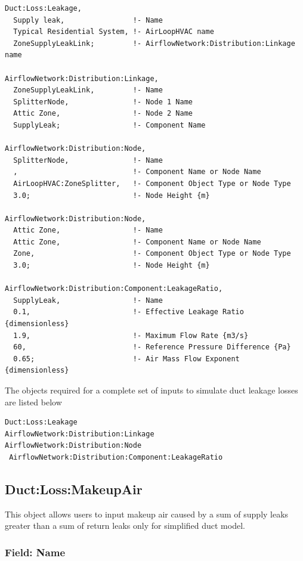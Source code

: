\begin{lstlisting}
Duct:Loss:Leakage,
  Supply leak,                !- Name
  Typical Residential System, !- AirLoopHVAC name
  ZoneSupplyLeakLink;         !- AirflowNetwork:Distribution:Linkage name

AirflowNetwork:Distribution:Linkage,
  ZoneSupplyLeakLink,         !- Name
  SplitterNode,               !- Node 1 Name
  Attic Zone,                 !- Node 2 Name
  SupplyLeak;                 !- Component Name

AirflowNetwork:Distribution:Node,
  SplitterNode,               !- Name
  ,                           !- Component Name or Node Name
  AirLoopHVAC:ZoneSplitter,   !- Component Object Type or Node Type
  3.0;                        !- Node Height {m}

AirflowNetwork:Distribution:Node,
  Attic Zone,                 !- Name
  Attic Zone,                 !- Component Name or Node Name
  Zone,                       !- Component Object Type or Node Type
  3.0;                        !- Node Height {m}

AirflowNetwork:Distribution:Component:LeakageRatio,
  SupplyLeak,                 !- Name
  0.1,                        !- Effective Leakage Ratio {dimensionless}
  1.9,                        !- Maximum Flow Rate {m3/s}
  60,                         !- Reference Pressure Difference {Pa}
  0.65;                       !- Air Mass Flow Exponent {dimensionless}
\end{lstlisting}

The objects required for a complete set of inputs to simulate duct leakage losses are listed below

\begin{lstlisting}
Duct:Loss:Leakage
AirflowNetwork:Distribution:Linkage
AirflowNetwork:Distribution:Node
 AirflowNetwork:Distribution:Component:LeakageRatio

\end{lstlisting}


\subsection{Duct:Loss:MakeupAir}\label{ductlossmakeupair}

This object allows users to input makeup air caused by a sum of supply leaks greater than a sum of return leaks only for simplified duct model.

\subsubsection{Field: Name}\label{duct-leakage-field-name-duct-000}

